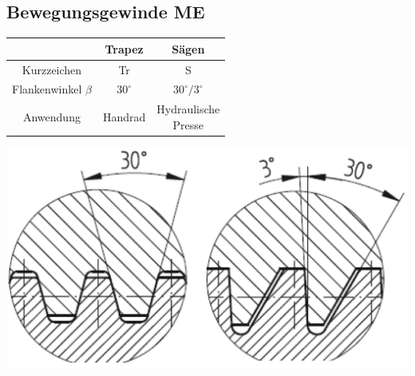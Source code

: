 \subsection{Bewegungsgewinde \hfill ME}
\begin{minipage}{0.58\linewidth}
    \begin{center}
        \begin{scriptsize}
            \begin{tabular}{|c|c|c|}
            \hline
            \null & \cellcolor{LimeGreen}Trapez & \cellcolor{GreenYellow}Sägen\\
            \hline
            Kurzzeichen & Tr & S \\
            \hline
            Flankenwinkel $\beta$ & $30^\circ$ & $30^\circ / 3^\circ$\\
            \hline
            Anwendung & Handrad & \thead{\scriptsize Hydraulische \\\scriptsize Presse}\\
            \hline
        \end{tabular}
        \end{scriptsize}
    \end{center}
\end{minipage}
\begin{minipage}{0.4\linewidth}
    \begin{center}
        \includegraphics[width = 0.9\linewidth]{src/images/MAEIP_BewG}
    \end{center}
\end{minipage}